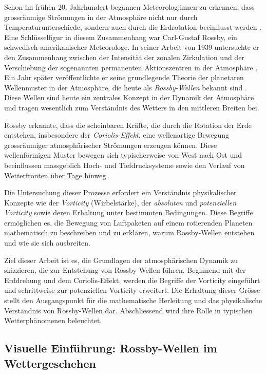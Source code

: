 

Schon im frühen 20. Jahrhundert begannen Meteorolog:innen zu erkennen, dass grossräumige Strömungen in der Atmosphäre nicht nur durch Temperaturunterschiede, sondern auch durch die Erdrotation beeinflusst werden \cite{https://doi.org/10.1002/wcc.95}.
Eine Schlüsselfigur in diesem Zusammenhang war Carl-Gustaf Rossby, ein schwedisch-amerikanischer Meteorologe.
In seiner Arbeit von 1939 untersuchte er den Zusammenhang zwischen der Intensität der zonalen Zirkulation und der Verschiebung der sogenannten permanenten Aktionszentren in der Atmosphäre \cite{rossby:1939relation}.
Ein Jahr später veröffentlichte er seine grundlegende Theorie der planetaren Wellenmuster in der Atmosphäre, die heute als \emph{Rossby-Wellen} bekannt sind \cite{rossby:1940planetary}.
Diese Wellen sind heute ein zentrales Konzept in der Dynamik der Atmosphäre und tragen wesentlich zum Verständnis des Wetters in den mittleren Breiten bei.

Rossby erkannte, dass die scheinbaren Kräfte, die durch die Rotation der Erde entstehen, insbesondere der \emph{Coriolis-Effekt}, eine wellenartige Bewegung grossräumiger atmosphärischer Strömungen erzeugen können.
Diese wellenförmigen Muster bewegen sich typischerweise von West nach Ost und beeinflussen massgeblich Hoch- und Tiefdrucksysteme sowie den Verlauf von Wetterfronten über Tage hinweg.

Die Untersuchung dieser Prozesse erfordert ein Verständnis physikalischer Konzepte wie der \emph{Vorticity} (Wirbelstärke), der \emph{absoluten} und \emph{potenziellen Vorticity} sowie deren Erhaltung unter bestimmten Bedingungen.
Diese Begriffe ermöglichen es, die Bewegung von Luftpaketen auf einem rotierenden Planeten mathematisch zu beschreiben und zu erklären, warum Rossby-Wellen entstehen und wie sie sich ausbreiten.

Ziel dieser Arbeit ist es, die Grundlagen der atmosphärischen Dynamik zu skizzieren, die zur Entstehung von Rossby-Wellen führen.
Beginnend mit der Erddrehung und dem Coriolis-Effekt, werden die Begriffe der Vorticity eingeführt und schrittweise zur potenziellen Vorticity erweitert.
Die Erhaltung dieser Grösse stellt den Ausgangspunkt für die mathematische Herleitung und das physikalische Verständnis von Rossby-Wellen dar.
Abschliessend wird ihre Rolle in typischen Wetterphänomenen beleuchtet.


\subsection{Visuelle Einführung: Rossby-Wellen im Wettergeschehen}

